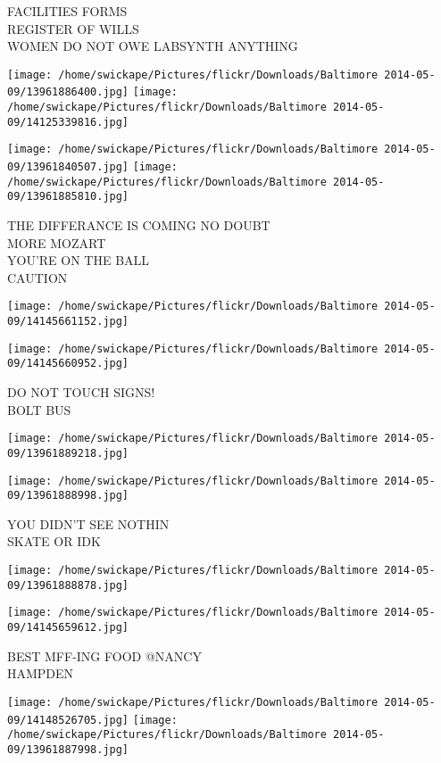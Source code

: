 \documentclass[10pt,letterpaper]{article}
\begin{document}
FACILITIES FORMS\\
REGISTER OF WILLS\\
WOMEN DO NOT OWE LABSYNTH ANYTHING
\pagebreak

\texttt{[image: /home/swickape/Pictures/flickr/Downloads/Baltimore 2014-05-09/13961886400.jpg]}
\texttt{[image: /home/swickape/Pictures/flickr/Downloads/Baltimore 2014-05-09/14125339816.jpg]}

\texttt{[image: /home/swickape/Pictures/flickr/Downloads/Baltimore 2014-05-09/13961840507.jpg]}
\texttt{[image: /home/swickape/Pictures/flickr/Downloads/Baltimore 2014-05-09/13961885810.jpg]}

THE DIFFERANCE IS COMING NO DOUBT\\
MORE MOZART\\
YOU'RE ON THE BALL\\
CAUTION
\pagebreak

\texttt{[image: /home/swickape/Pictures/flickr/Downloads/Baltimore 2014-05-09/14145661152.jpg]}

\vspace{0.25in}
\texttt{[image: /home/swickape/Pictures/flickr/Downloads/Baltimore 2014-05-09/14145660952.jpg]}

DO NOT TOUCH SIGNS!\\
BOLT BUS
\pagebreak

\texttt{[image: /home/swickape/Pictures/flickr/Downloads/Baltimore 2014-05-09/13961889218.jpg]}

\vspace{0.25in}
\texttt{[image: /home/swickape/Pictures/flickr/Downloads/Baltimore 2014-05-09/13961888998.jpg]}

YOU DIDN'T SEE NOTHIN\\
SKATE OR IDK
\pagebreak

\texttt{[image: /home/swickape/Pictures/flickr/Downloads/Baltimore 2014-05-09/13961888878.jpg]}

\vspace{0.25in}
\texttt{[image: /home/swickape/Pictures/flickr/Downloads/Baltimore 2014-05-09/14145659612.jpg]}

BEST MFF{-}ING FOOD @NANCY\\
HAMPDEN
\pagebreak

\texttt{[image: /home/swickape/Pictures/flickr/Downloads/Baltimore 2014-05-09/14148526705.jpg]}
\texttt{[image: /home/swickape/Pictures/flickr/Downloads/Baltimore 2014-05-09/13961887998.jpg]}
\end{document}
